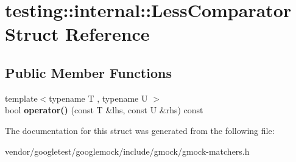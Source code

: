 \hypertarget{structtesting_1_1internal_1_1_less_comparator}{}\section{testing\+:\+:internal\+:\+:Less\+Comparator Struct Reference}
\label{structtesting_1_1internal_1_1_less_comparator}
\subsection*{Public Member Functions}
\begin{DoxyCompactItemize}
\item 
\mbox{\label{structtesting_1_1internal_1_1_less_comparator_a03d072616e29586a62bd638e47d4a11c}} 
{\footnotesize template$<$typename T , typename U $>$ }\\bool {\bfseries operator()} (const T \&lhs, const U \&rhs) const
\end{DoxyCompactItemize}


The documentation for this struct was generated from the following file\+:\begin{DoxyCompactItemize}
\item 
vendor/googletest/googlemock/include/gmock/gmock-\/matchers.\+h\end{DoxyCompactItemize}
